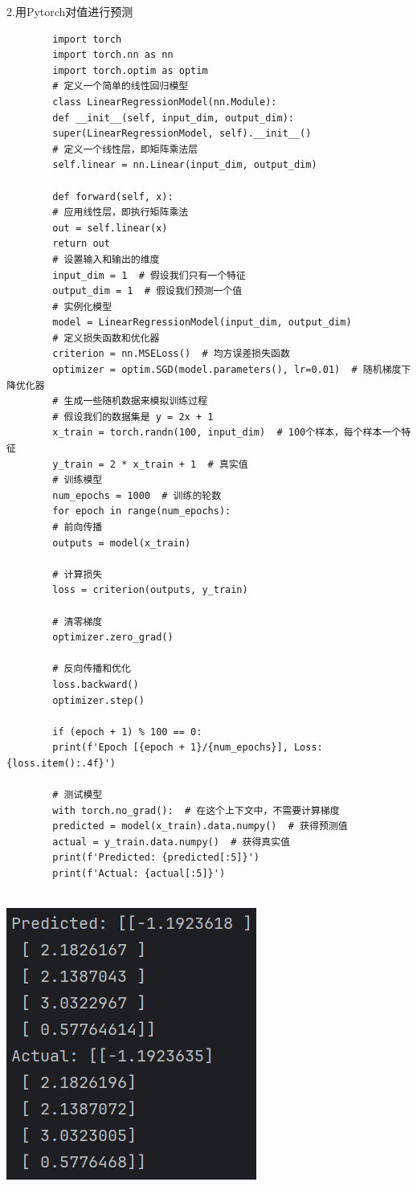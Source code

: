 \documentclass{article}
\begin{document}
	2.用Pytorch对值进行预测
	\begin{verbatim}
		import torch
		import torch.nn as nn
		import torch.optim as optim
		# 定义一个简单的线性回归模型
		class LinearRegressionModel(nn.Module):
		def __init__(self, input_dim, output_dim):
		super(LinearRegressionModel, self).__init__()
		# 定义一个线性层，即矩阵乘法层
		self.linear = nn.Linear(input_dim, output_dim)
		
		def forward(self, x):
		# 应用线性层，即执行矩阵乘法
		out = self.linear(x)
		return out
		# 设置输入和输出的维度
		input_dim = 1  # 假设我们只有一个特征
		output_dim = 1  # 假设我们预测一个值
		# 实例化模型
		model = LinearRegressionModel(input_dim, output_dim)
		# 定义损失函数和优化器
		criterion = nn.MSELoss()  # 均方误差损失函数
		optimizer = optim.SGD(model.parameters(), lr=0.01)  # 随机梯度下降优化器
		# 生成一些随机数据来模拟训练过程
		# 假设我们的数据集是 y = 2x + 1
		x_train = torch.randn(100, input_dim)  # 100个样本，每个样本一个特征
		y_train = 2 * x_train + 1  # 真实值
		# 训练模型
		num_epochs = 1000  # 训练的轮数
		for epoch in range(num_epochs):
		# 前向传播
		outputs = model(x_train)
		
		# 计算损失
		loss = criterion(outputs, y_train)
		
		# 清零梯度
		optimizer.zero_grad()
		
		# 反向传播和优化
		loss.backward()
		optimizer.step()
		
		if (epoch + 1) % 100 == 0:
		print(f'Epoch [{epoch + 1}/{num_epochs}], Loss: {loss.item():.4f}')
		
		# 测试模型
		with torch.no_grad():  # 在这个上下文中，不需要计算梯度
		predicted = model(x_train).data.numpy()  # 获得预测值
		actual = y_train.data.numpy()  # 获得真实值
		print(f'Predicted: {predicted[:5]}')
		print(f'Actual: {actual[:5]}')
		
	\end{verbatim}
	
	\noindent
	\begin{minipage}{\linewidth}
		\centering
		\includegraphics[width=0.5\linewidth]{example2.png}
		\label{fig:example}
	\end{minipage}
	
\end{document}
